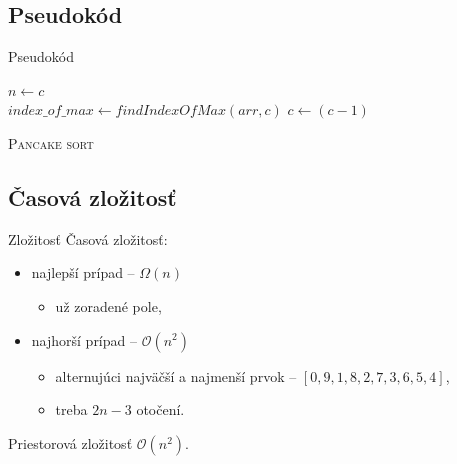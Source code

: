 \documentclass[10pt, hyperref={unicode}, compress]{beamer}
\begin{document}
        \subsection{Pseudokód}
            \begin{frame}{Pseudokód}
                \begin{algorithm}[H]
                    \setcounter{algocf}{1}
                    \BlankLine
                    $n \gets c$ \\
                    {
                        $index\_of\_max \gets findIndexOfMax(arr, c) $
                        \BlankLine
                        $c \gets (c - 1)$
                    }
                \caption{\textsc{Pancake sort}}
                \label{algo}
                \end{algorithm}
            \end{frame}
        
        \subsection{Časová zložitosť}
            \begin{frame}{Zložitosť}
                Časová zložitosť:
                \begin{itemize}
                    \item najlepší prípad -- $\Omega(n)$
                        \begin{itemize}
                            \item už zoradené pole,
                        \end{itemize}
                    \item najhorší prípad -- $\mathcal{O}(n^2)$
                        \begin{itemize}
                            \item alternujúci najväčší a najmenší prvok -- $[0, 9, 1, 8, 2, 7, 3, 6, 5, 4]$,
                            \item treba $2n-3$ otočení.
                        \end{itemize}
                \end{itemize}
                \medskip
                Priestorová zložitosť $\mathcal{O}(n^2)$.
            \end{frame}
    
\end{document}
